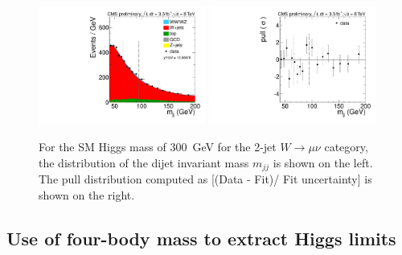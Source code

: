 \begin{figure}[!t]
  \centering
  \includegraphics[width=0.49\textwidth]{plots/anaexample/H300_Mjj_Muon_2jets_Stacked}
  \includegraphics[width=0.49\textwidth]{plots/anaexample/H300_Mjj_Muon_2jets_Pull}
  \caption{\label{fig:mjj_mH350}For the SM Higgs mass of
    300~GeV for the 2-jet $W\to\mu\nu$ category, the distribution of
    the dijet invariant mass $m_{jj}$ is shown on the left. The pull
    distribution computed as [(Data - Fit)/ Fit uncertainty] is shown
    on the right. } %
\end{figure}


\subsection{Use of four-body mass to extract Higgs limits}
\label{sec:mlvjjforlimit}


